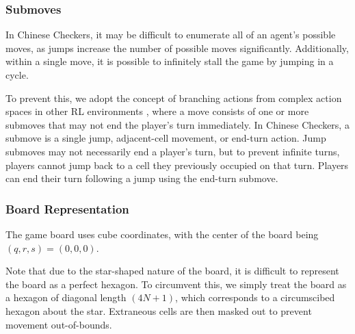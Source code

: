 \documentclass[12pt, a4paper, twocolumn]{article}
\begin{document}
\subsubsection{Submoves}

In Chinese Checkers, it may be difficult to enumerate all of an agent's possible moves, as jumps increase the number of possible moves significantly. Additionally, within a single move, it is possible to infinitely stall the game by jumping in a cycle.

To prevent this, we adopt the concept of branching actions from complex action spaces in other RL environments \cite{BranchingActions}, where a move consists of one or more submoves that may not end the player's turn immediately. In Chinese Checkers, a submove is a single jump, adjacent-cell movement, or end-turn action. Jump submoves may not necessarily end a player's turn, but to prevent infinite turns, players cannot jump back to a cell they previously occupied on that turn. Players can end their turn following a jump using the end-turn submove.

\subsubsection{Board Representation}
The game board uses cube coordinates, with the center of the board being $(q, r, s) = (0, 0, 0)$.

Note that due to the star-shaped nature of the board, it is difficult to represent the board as a perfect hexagon. To circumvent this, we simply treat the board as a hexagon of diagonal length $(4N+1)$, which corresponds to a circumscibed hexagon about the star. Extraneous cells are then masked out to prevent movement out-of-bounds. 

\end{document}
